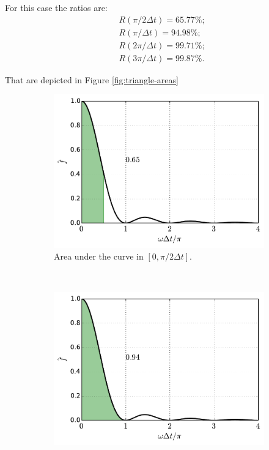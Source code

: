 \documentclass[12pt,letterpaper]{article}
\begin{document}
{For this case the ratios are:
\begin{align*}
    &R(\pi/2\Delta t) = 65.77\%;\\
    &R(\pi/\Delta t) = 94.98\%;\\
    &R(2\pi/\Delta t) = 99.71\%;\\
    &R(3\pi/\Delta t) = 99.87\%.
\end{align*}

That are depicted in Figure \ref{fig:triangle-areas}
\begin{figure}[h]
    \centering
    \begin{subfigure}[b]{0.45\textwidth}
        \includegraphics[width=\textwidth]{img/triangle_area=1.pdf}
        \caption{Area under the curve in $[0,\pi/2\Delta t]$.}
    \end{subfigure}\
    \begin{subfigure}[b]{0.45\textwidth}
        \includegraphics[width=\textwidth]{img/triangle_area=2.pdf}

\end{subfigure}
\end{figure}}
\end{document}
